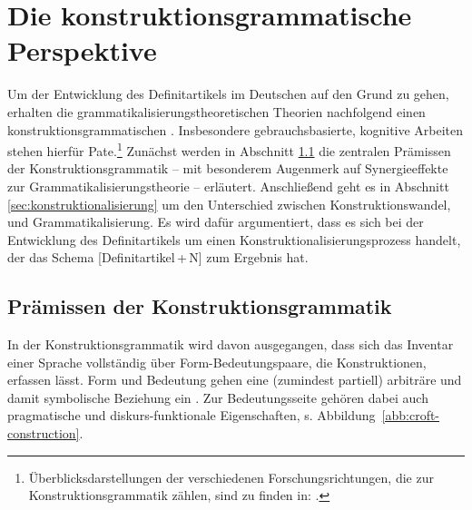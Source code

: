 \section{Die konstruktionsgrammatische Perspektive}\label{sec:kxg}
Um der Entwicklung des Definitartikels im Deutschen auf den Grund zu gehen, erhalten die grammatikalisierungstheoretischen Theorien nachfolgend einen konstruktionsgrammatischen . Insbesondere gebrauchsbasierte, kognitive  Arbeiten \parencite[u.a.][]{Langacker1987,Goldberg1995,Goldberg2006,Croft2002,Croft2004,Bybee2006,Bybee2010} stehen hierfür Pate.\footnote{Überblicksdarstellungen der verschiedenen Forschungsrichtungen, die zur Konstruktionsgrammatik zählen, sind zu finden in:   \textcite{Croft2004,Imo2007,Stefanowitsch2011,Hoffmann2013,Ziem2013}.} Zunächst werden in Abschnitt \ref{sec:kxg-grundlagen} die zentralen Prämissen der Konstruktionsgrammatik -- mit besonderem Augenmerk auf Synergieeffekte zur Grammatikalisierungstheorie -- erläutert. Anschließend geht es in Abschnitt \ref{sec:konstruktionalisierung} um den Unterschied zwischen Konstruktionswandel,   und Grammatikalisierung. Es wird dafür argumentiert, dass es sich bei der Entwicklung des Definitartikels um einen Konstruktionalisierungsprozess  handelt, der das Schema [Definitartikel\,+\,N] zum Ergebnis hat.  

\subsection{Prämissen der Konstruktionsgrammatik}\label{sec:kxg-grundlagen}


In der Konstruktionsgrammatik wird davon ausgegangen, dass sich das Inventar einer Sprache vollständig über Form-Bedeutungspaare, die Konstruktionen, erfassen lässt. Form und Bedeutung gehen eine (zumindest partiell) arbiträre und damit symbolische Beziehung ein \parencite[257]{Croft2004}. Zur Bedeutungsseite gehören dabei auch pragmatische und diskurs-funktionale Eigenschaften, s. Abbildung~\ref{abb:croft-construction}.  

